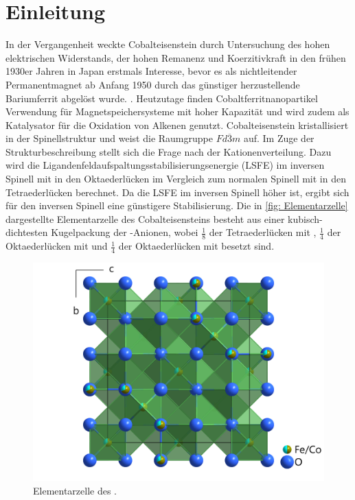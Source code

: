 \documentclass[a4paper,12pt,bibliography=totocnumbered]{scrartcl}
\begin{document}
\clearpage

\renewcommand{\thepage}{\arabic{page}}
\setcounter{page}{1}


\section{Einleitung}
In der Vergangenheit weckte Cobalteisenstein durch Untersuchung des hohen elektrischen Widerstands, der hohen Remanenz und Koerzitivkraft in den frühen 1930er Jahren in Japan erstmals Interesse, bevor es als nichtleitender Permanentmagnet ab Anfang 1950 durch das günstiger herzustellende Bariumferrit abgelöst wurde.
\cite{History}.
Heutzutage finden Cobaltferritnanopartikel Verwendung für Magnetspeichersysteme mit hoher Kapazität und  wird zudem als Katalysator für die Oxidation von Alkenen genutzt. \cite{Rieck}
Cobalteisenstein kristallisiert in der Spinellstruktur und weist die Raumgruppe $Fd \overline{3} m$ auf. 
Im Zuge der Strukturbeschreibung stellt sich die Frage nach der Kationenverteilung. 
Dazu wird die Ligandenfeldaufspaltungsstabilisierungsenergie (LSFE) im inversen Spinell mit  in den Oktaederlücken im Vergleich zum normalen Spinell mit  in den Tetraederlücken berechnet. 
Da die LSFE im inversen Spinell höher ist, ergibt sich für den inversen Spinell eine günstigere Stabilisierung.
Die in \autoref{fig: Elementarzelle} dargestellte Elementarzelle des Cobalteisensteins besteht aus einer kubisch-dichtesten Kugelpackung der -Anionen, wobei $\frac{1}{8}$ der Tetraederlücken mit , 
$\frac{1}{4}$ der Oktaederlücken mit  und $\frac{1}{4}$ der Oktaederlücken mit  besetzt sind. \\

\begin{figure}[H]
    \centering
    \includegraphics[scale=0.2]{Bilder/Elementarzelle.png}
    \caption{Elementarzelle des .\cite{Rieck}}
    \label{fig: Elementarzelle}
\end{figure}
\end{document}
